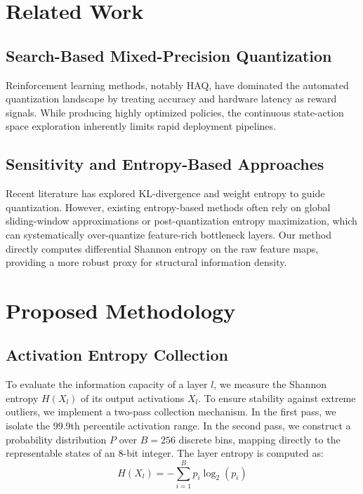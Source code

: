\documentclass[journal]{IEEEtran}
\begin{document}
\section{Related Work}
\subsection{Search-Based Mixed-Precision Quantization}
Reinforcement learning methods, notably HAQ, have dominated the automated quantization landscape by treating accuracy and hardware latency as reward signals. While producing highly optimized policies, the continuous state-action space exploration inherently limits rapid deployment pipelines.

\subsection{Sensitivity and Entropy-Based Approaches}
Recent literature has explored KL-divergence and weight entropy to guide quantization. However, existing entropy-based methods often rely on global sliding-window approximations or post-quantization entropy maximization, which can systematically over-quantize feature-rich bottleneck layers. Our method directly computes differential Shannon entropy on the raw feature maps, providing a more robust proxy for structural information density.

\section{Proposed Methodology}

\subsection{Activation Entropy Collection}
To evaluate the information capacity of a layer $l$, we measure the Shannon entropy $H(X_l)$ of its output activations $X_l$. To ensure stability against extreme outliers, we implement a two-pass collection mechanism. In the first pass, we isolate the 99.9th percentile activation range. In the second pass, we construct a probability distribution $P$ over $B=256$ discrete bins, mapping directly to the representable states of an 8-bit integer. The layer entropy is computed as:
\begin{equation}
    H(X_l) = -\sum_{i=1}^{B} p_i \log_2(p_i)
\end{equation}
\end{document}
